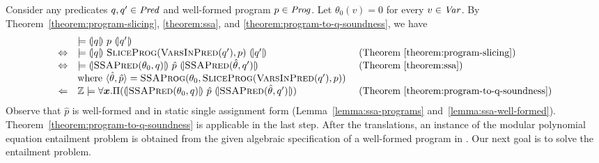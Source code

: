 
Consider any predicates $q, q' \in \mathit{Pred}$ and well-formed program $p \in
\mathit{Prog}$. Let $\theta_0 (v) = 0$ for every $v \in \mathit{Var}$. By
Theorem~\ref{theorem:program-slicing}, \ref{theorem:ssa}, and
\ref{theorem:program-to-q-soundness}, we have
\begin{equation*}
  \begin{array}{cll}
    & \models \hoaretriple{q}{p}{q'}\\
    \Leftrightarrow
    & \models 
      \hoaretriple{q}{\textsc{SliceProg}(\textsc{VarsInPred}(q'), p)}{q'}
    & \textmd{ (Theorem~\ref{theorem:program-slicing})}\\
    \Leftrightarrow
    & \models
      \hoaretriple{\textsc{SSAPred}(\theta_0, q)}
      {\hat{p}}
      {\textsc{SSAPred}(\hat{\theta}, q')}
    & \textmd{ (Theorem~\ref{theorem:ssa})}\\
    &
      \textmd{where } \langle \hat{\theta}, \hat{p} \rangle = 
      \textsc{SSAProg} (\theta_0, \textsc{SliceProg}
      (\textsc{VarsInPred}(q'), p))\\
    \Leftarrow
    & \bbfZ \models \forall \vx.
      \Pi (\hoaretriple{\textsc{SSAPred}(\theta_0, q)} {\hat{p}}
      {\textsc{SSAPred}(\hat{\theta}, q')})
    & \textmd{ (Theorem~\ref{theorem:program-to-q-soundness})}
  \end{array}
\end{equation*}
Observe that $\hat{p}$ is well-formed and in static single assignment
form (Lemma~\ref{lemma:ssa-programs} and~\ref{lemma:ssa-well-formed}).
Theorem~\ref{theorem:program-to-q-soundness} is applicable in the last
step. After the translations, an instance of the modular
polynomial equation entailment problem is obtained from the given
algebraic specification of a well-formed program in \mydsl. Our next
goal is to solve the entailment problem.